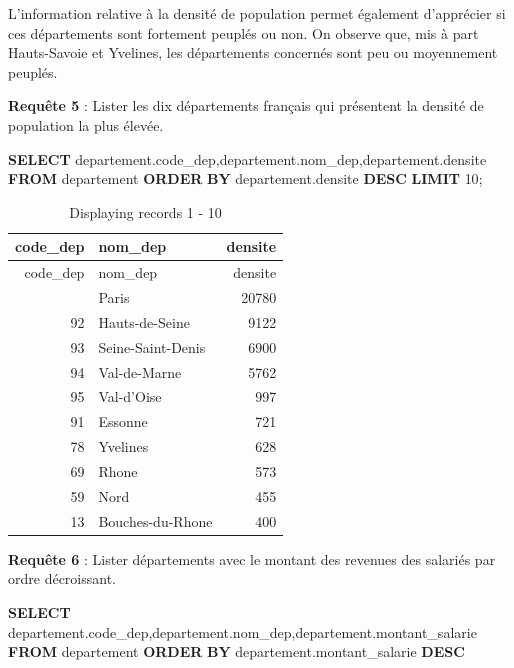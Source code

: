 \documentclass[mstat,12pt]{unswthesis}
\newenvironment{Shaded}{\begin{snugshade}}{\end{snugshade}}
\newcommand{\DecValTok}[1]{\textcolor[rgb]{0.00,0.00,0.81}{#1}}
\newcommand{\KeywordTok}[1]{\textcolor[rgb]{0.13,0.29,0.53}{\textbf{#1}}}
\newcommand{\NormalTok}[1]{#1}
\begin{document}
L'information relative à la densité de population permet également
d'apprécier si ces départements sont fortement peuplés ou non. On
observe que, mis à part Hauts-Savoie et Yvelines, les départements
concernés sont peu ou moyennement peuplés.

\medskip

\textbf{Requête 5} : Lister les dix départements français qui présentent
la densité de population la plus élevée.

\begin{Shaded}
\begin{Highlighting}[]
\KeywordTok{SELECT}\NormalTok{ departement.code\_dep,departement.nom\_dep,departement.densite}
\KeywordTok{FROM}\NormalTok{ departement}
\KeywordTok{ORDER} \KeywordTok{BY}\NormalTok{ departement.densite }\KeywordTok{DESC}
\KeywordTok{LIMIT} \DecValTok{10}\NormalTok{;}
\end{Highlighting}
\end{Shaded}

\begin{longtable}[]{@{}rlr@{}}
\caption{Displaying records 1 - 10}\tabularnewline
\toprule\noalign{}
code\_dep & nom\_dep & densite \\
\midrule\noalign{}
\endfirsthead
\toprule\noalign{}
code\_dep & nom\_dep & densite \\
\midrule\noalign{}
\endhead
\bottomrule\noalign{}
\endlastfoot
75 & Paris & 20780 \\
92 & Hauts-de-Seine & 9122 \\
93 & Seine-Saint-Denis & 6900 \\
94 & Val-de-Marne & 5762 \\
95 & Val-d'Oise & 997 \\
91 & Essonne & 721 \\
78 & Yvelines & 628 \\
69 & Rhone & 573 \\
59 & Nord & 455 \\
13 & Bouches-du-Rhone & 400 \\
\end{longtable}

\medskip

\textbf{Requête 6} : Lister départements avec le montant des revenues
des salariés par ordre décroissant.

\begin{Shaded}
\begin{Highlighting}[]
\KeywordTok{SELECT}\NormalTok{ departement.code\_dep,departement.nom\_dep,departement.montant\_salarie}
\KeywordTok{FROM}\NormalTok{ departement}
\KeywordTok{ORDER} \KeywordTok{BY}\NormalTok{ departement.montant\_salarie }\KeywordTok{DESC}
\end{Highlighting}
\end{Shaded}
\end{document}

